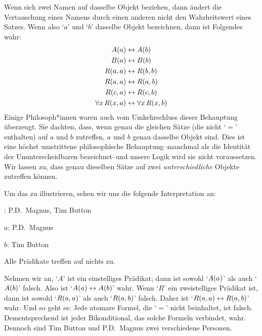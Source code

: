Wenn sich zwei Namen auf dasselbe Objekt beziehen, dann ändert die Vertauschung eines Namens durch einen anderen nicht den Wahrheitswert eines Satzes. Wenn also `$a$' und `$b$' dasselbe Objekt bezeichnen, dann ist Folgendes wahr:\label{model.nonidentity}
	\begin{align*}
	 	\mathord{A}(a) &\leftrightarrow \mathord{A}(b) \\
	 	\mathord{B}(a) &\leftrightarrow \mathord{B}(b)\\
		\mathord{R}(a,a) &\leftrightarrow \mathord{R}(b,b)\\
		\mathord{R}(a,a) & \leftrightarrow \mathord{R}(a,b)\\
		\mathord{R}(c,a) &\leftrightarrow \mathord{R}(c,b)\\
		\forall x\, \mathord{R}(x,a) &\leftrightarrow \forall x\, \mathord{R}(x,b)
	\end{align*}
Einige Philosoph*innen waren auch vom Umkehrschluss dieser Behauptung überzeugt. Sie dachten, dass, wenn genau die gleichen Sätze (die nicht `$=$' enthalten) auf $a$ und $b$ zutreffen, $a$ und $b$ genau dasselbe Objekt sind. Dies ist eine höchst umstrittene philosophische Behauptung--manchmal als die Identität der Ununterscheidbaren bezeichnet--und unsere Logik wird sie nicht voraussetzen. Wir lassen zu, dass genau dieselben Sätze auf zwei \emph{unterschiedliche} Objekte zutreffen können.  

Um das zu illustrieren, sehen wir uns die folgende Interpretation an:
	\begin{ebullet}
		\item[\text{domain}:] P.D.\ Magnus, Tim Button
		\item[$a$:] P.D.\ Magnus
		\item[$b$:] Tim Button
		\item Alle Prädikate treffen auf nichts zu.
	\end{ebullet}
Nehmen wir an, `$A$' ist ein einstelliges Prädikat; dann ist sowohl `$\mathord{A}(a)$' als auch `$\mathord{A}(b)$' falsch. Also ist `$\mathord{A}(a) \leftrightarrow \mathord{A}(b)$' wahr. Wenn `$R$' ein zweistelliges Prädikat ist, dann ist sowohl `$\mathord{R}(a,a)$' als auch `$\mathord{R}(a,b)$' falsch. Daher ist `$\mathord{R}(a,a) \leftrightarrow \mathord{R}(a,b)$' wahr. Und so geht es: Jede atomare Formel, die `$=$' nicht beinhaltet, ist falsch. Dementsprechend ist jeder Bikonditional, das solche Formeln verbindet, wahr. Dennoch sind Tim Button und P.D.\ Magnus zwei verschiedene Personen.

